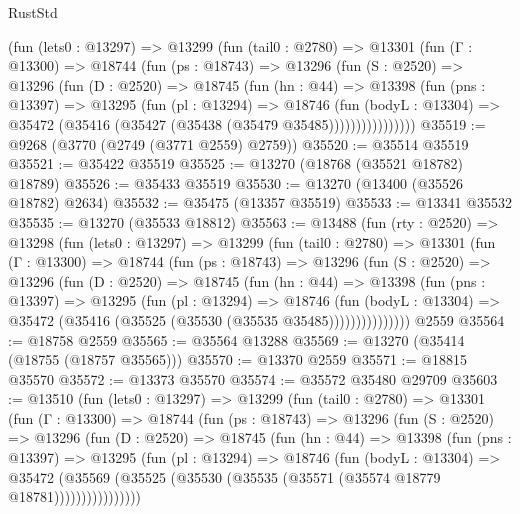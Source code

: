 \begin{lexlean}{RustStd}
\begin{coremodule}
        (fun (lets0 : @13297) =>
        @13299
          (fun (tail0 : @2780) =>
          @13301
            (fun (Γ : @13300) =>
            @18744
              (fun (ps : @18743) =>
              @13296
                (fun (S : @2520) =>
                @13296
                  (fun (D : @2520) =>
                  @18745
                    (fun (hn : @44) =>
                    @13398
                      (fun (pns : @13397) =>
                      @13295
                        (fun (pl : @13294) =>
                        @18746
                          (fun (bodyL : @13304) =>
                          @35472 (@35416 (@35427 (@35438 (@35479 @35485))))))))))))))))
@35519 := @9268 (@3770 (@2749 (@3771 @2559) @2759))
@35520 := @35514 @35519
@35521 := @35422 @35519
@35525 := @13270 (@18768 (@35521 @18782) @18789)
@35526 := @35433 @35519
@35530 := @13270 (@13400 (@35526 @18782) @2634)
@35532 := @35475 (@13357 @35519)
@35533 := @13341 @35532
@35535 := @13270 (@35533 @18812)
@35563 := @13488
    (fun (rty : @2520) =>
    @13298
      (fun (lets0 : @13297) =>
      @13299
        (fun (tail0 : @2780) =>
        @13301
          (fun (Γ : @13300) =>
          @18744
            (fun (ps : @18743) =>
            @13296
              (fun (S : @2520) =>
              @13296
                (fun (D : @2520) =>
                @18745
                  (fun (hn : @44) =>
                  @13398
                    (fun (pns : @13397) =>
                    @13295
                      (fun (pl : @13294) =>
                      @18746
                        (fun (bodyL : @13304) =>
                        @35472 (@35416 (@35525 (@35530 (@35535 @35485)))))))))))))))
    @2559
@35564 := @18758 @2559
@35565 := @35564 @13288
@35569 := @13270 (@35414 (@18755 (@18757 @35565)))
@35570 := @13370 @2559
@35571 := @18815 @35570
@35572 := @13373 @35570
@35574 := @35572 @35480 @29709
@35603 := @13510
    (fun (lets0 : @13297) =>
    @13299
      (fun (tail0 : @2780) =>
      @13301
        (fun (Γ : @13300) =>
        @18744
          (fun (ps : @18743) =>
          @13296
            (fun (S : @2520) =>
            @13296
              (fun (D : @2520) =>
              @18745
                (fun (hn : @44) =>
                @13398
                  (fun (pns : @13397) =>
                  @13295
                    (fun (pl : @13294) =>
                    @18746
                      (fun (bodyL : @13304) =>
                      @35472
                        (@35569
                          (@35525 (@35530 (@35535 (@35571 (@35574 @18779 @18781))))))))))))))))

\end{coremodule}
\end{lexlean}
